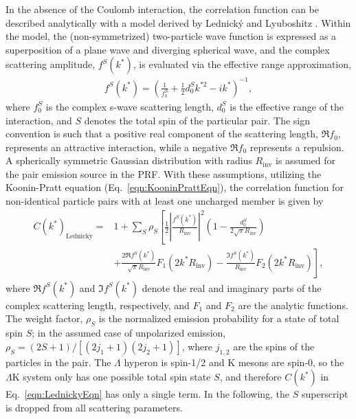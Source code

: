 \documentclass[ALICE,manyauthors]{cernphprep}
\newcommand{\Lam}{$\Lambda$\xspace}
\newcommand{\LamK}{$\Lambda$K\xspace}
\begin{document}
In the absence of the Coulomb interaction, the correlation function can be described analytically with a model derived by Lednick\'y and Lyuboshitz \cite{Lednicky:82}.
Within the model, the (non-symmetrized) two-particle wave function is expressed as a superposition of a plane wave and diverging spherical wave, and the complex scattering amplitude, $f^{S}(k^{*})$, is evaluated via the effective range approximation,
\begin{equation}
\begin{aligned}
f^{S}(k^{*}) = \left( \frac{1}{f^{S}_{0}} + \frac{1}{2}d^{S}_{0}k^{*2} - ik^{*} \right)^{-1},
\end{aligned}
\label{eqn:ScatteringParam}
\end{equation}
where $f^{S}_{0}$ is the complex s-wave scattering length, $d^{S}_{0}$ is the effective range of the interaction, and $S$ denotes the total spin of the particular pair.
The sign convention is such that a positive real component of the scattering length, $\Re f_{0}$, represents an attractive interaction, while a negative $\Re f_{0}$ represents a repulsion.
A spherically symmetric Gaussian distribution with radius $R_{\mathrm{inv}}$  is assumed for the pair emission source in the PRF.
With these assumptions, utilizing the Koonin-Pratt equation (Eq.\ \ref{eqn:KooninPrattEqn}), the correlation function for non-identical particle pairs with at least one uncharged member is given by \cite{Lednicky:82}
\begin{equation}
\begin{aligned}
C(k^{*})_{\mathrm{Lednick\acute{y}}} = &1 + \sum_{S}\rho_{S}\left[\frac{1}{2}\left|\frac{f^{S}(k^{*})}{R_{\mathrm{inv}}}\right|^2\left(1-\frac{d^{S}_{0}}{2\sqrt{\pi}R_{\mathrm{inv}}}\right) \right. \\
&+ \left. \frac{2\Re f^{S}(k^{*})}{\sqrt{\pi}R_{\mathrm{inv}}}F_{1}(2k^{*}R_{\mathrm{inv}})-\frac{\Im f^{S}(k^{*})}{R_{\mathrm{inv}}}F_{2}(2k^{*}R_{\mathrm{inv}})\right],
\end{aligned}  
\label{eqn:LednickyEqn}
\end{equation}
where $\Re f^{S}(k^{*})$ and $\Im f^{S}(k^{*})$ denote the real and imaginary parts of the complex scattering length, respectively, and $F_{1}$ and $F_{2}$ are the analytic functions.
The weight factor, $\rho_{S}$ is the normalized emission probability for a state of total spin $S$; in the assumed case of unpolarized emission, $\rho_{S} = (2S+1)/[(2j_{1}+1)(2j_{2}+1)]$, where $j_{1,2}$ are the spins of the particles in the pair.
The \Lam hyperon is spin-1/2 and K mesons are spin-0, so the \LamK system only has one possible total spin state $S$, and therefore $C(k^{*})$ in Eq.\ \ref{eqn:LednickyEqn} has only a single term.
In the following, the $S$ superscript is dropped from all scattering parameters.
\end{document}
